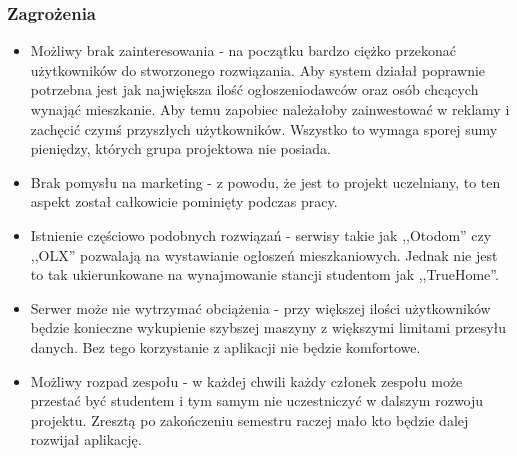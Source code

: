 \documentclass[polish, 11pt]{article}
\begin{document}
        \subsubsection{Zagrożenia}
            \begin{itemize}
                \item Możliwy brak zainteresowania - na początku bardzo ciężko przekonać użytkowników do stworzonego rozwiązania. Aby system działał poprawnie potrzebna jest jak największa ilość ogłoszeniodawców oraz osób chcących wynająć mieszkanie. Aby temu zapobiec należałoby zainwestować w reklamy i zachęcić czymś przyszłych użytkowników. Wszystko to wymaga sporej sumy pieniędzy, których grupa projektowa nie posiada.
                \item Brak pomysłu na marketing - z powodu, że jest to projekt uczelniany, to ten aspekt został całkowicie pominięty podczas pracy.
                \item Istnienie częściowo podobnych rozwiązań - serwisy takie jak ,,Otodom'' czy ,,OLX'' pozwalają na wystawianie ogłoszeń mieszkaniowych. Jednak nie jest to tak ukierunkowane na wynajmowanie stancji studentom jak ,,TrueHome''.
                \item Serwer może nie wytrzymać obciążenia - przy większej ilości użytkowników będzie konieczne wykupienie szybszej maszyny z większymi limitami przesyłu danych. Bez tego korzystanie z aplikacji nie będzie komfortowe.
                \item Możliwy rozpad zespołu - w każdej chwili każdy członek zespołu może przestać być studentem i tym samym nie uczestniczyć w dalszym rozwoju projektu. Zresztą po zakończeniu semestru raczej mało kto będzie dalej rozwijał aplikację.
            \end{itemize}
\end{document}
